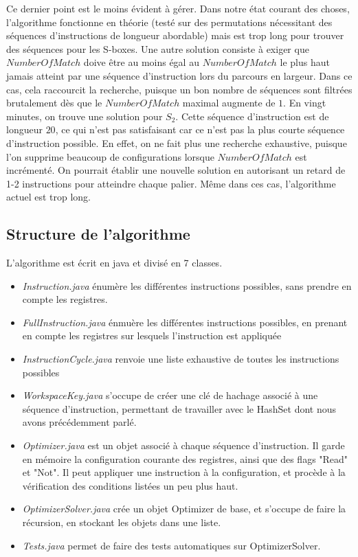 \documentclass{article}
\begin{document}
\medbreak

Ce dernier point est le moins évident à gérer. Dans notre état courant des choses, l'algorithme fonctionne en théorie (testé sur des permutations nécessitant des séquences d'instructions de longueur abordable) mais est trop long pour trouver des séquences pour les S-boxes. Une autre solution consiste à exiger que $NumberOfMatch$ doive être au moins égal au $NumberOfMatch$ le plus haut jamais atteint par une séquence d'instruction lors du parcours en largeur. Dans ce cas, cela raccourcit la recherche, puisque un bon nombre de séquences sont filtrées brutalement dès que le $NumberOfMatch$ maximal augmente de $1$. En vingt minutes, on trouve une solution pour $S_2$. Cette séquence d'instruction est de longueur $20$, ce qui n'est pas satisfaisant car ce n'est pas la plus courte séquence d'instruction possible. En effet, on ne fait plus une recherche exhaustive, puisque l'on supprime beaucoup de configurations lorsque $NumberOfMatch$ est incrémenté. On pourrait établir une nouvelle solution en autorisant un retard de 1-2 instructions pour atteindre chaque palier. Même dans ces cas, l'algorithme actuel est trop long.

\subsection{Structure de l'algorithme}

L'algorithme est écrit en java et divisé en 7 classes.
\medbreak
\begin{itemize}
\setlength\itemsep{1em}
\item \textit{Instruction.java} énumère les différentes instructions possibles, sans prendre en compte les registres.
\item \textit{FullInstruction.java} énmuère les différentes instructions possibles, en prenant en compte les registres sur lesquels l'instruction est appliquée
\item \textit{InstructionCycle.java} renvoie une liste exhaustive de toutes les instructions possibles
\item \textit{WorkspaceKey.java} s'occupe de créer une clé de hachage associé à une séquence d'instruction, permettant de travailler avec le HashSet dont nous avons précédemment parlé.
\item \textit{Optimizer.java} est un objet associé à chaque séquence d'instruction. Il garde en mémoire la configuration courante des registres, ainsi que des flags "Read" et "Not". Il peut appliquer une instruction à la configuration, et procède à la vérification des conditions listées un peu plus haut.
\item \textit{OptimizerSolver.java} crée un objet Optimizer de base, et s'occupe de faire la récursion, en stockant les objets dans une liste.
\item \textit{Tests.java} permet de faire des tests automatiques sur OptimizerSolver.
 
\end{itemize}
\end{document}
